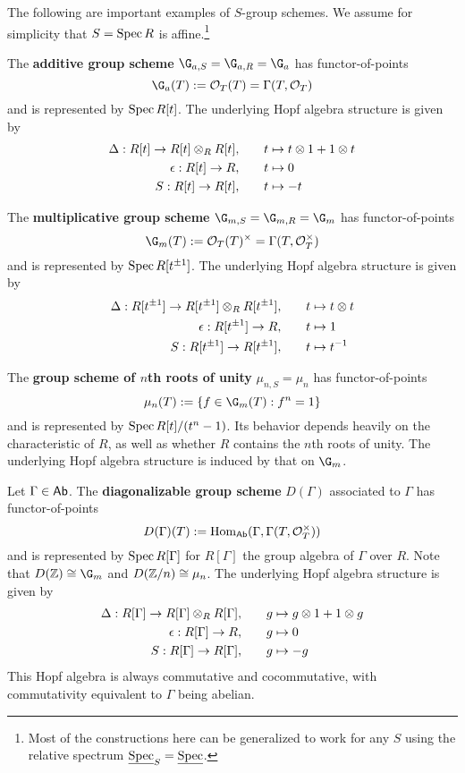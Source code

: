\documentclass[11pt]{article}
\begin{document}
\begin{example}
The following are important examples of $S$-group schemes. We assume for simplicity that $S=\operatorname{Spec} R$ is affine.\footnote{Most of the constructions here can be generalized to work for any $S$ using the relative spectrum $\underline{\operatorname{Spec}}_S=\underline{\operatorname{Spec}}$.}
\begin{enum}{\arabic}
\item The \textbf{additive group scheme} $\G_{a,S}=\G_{a,R}=\G_a$ has functor-of-points 
$$\G_a(T):=\O_T(T)=\Gamma(T,\O_T)$$ 
and is represented by $\operatorname{Spec} R[t]$. The underlying Hopf algebra structure is given by 
\begin{align*}
\Delta: R[t]\to R[t]\otimes_RR[t], \qquad &t\mapsto t\otimes1+1\otimes t \\
\epsilon: R[t]\to R, \qquad &t\mapsto0 \\
S: R[t]\to R[t], \qquad &t\mapsto-t
\end{align*}

\item The \textbf{multiplicative group scheme} $\G_{m,S}=\G_{m,R}=\G_m$ has functor-of-points 
$$\G_m(T):=\O_T(T)^{\times}=\Gamma(T,\O_T^{\times})$$ 
and is represented by $\operatorname{Spec} R[t^{\pm1}]$. The underlying Hopf algebra structure is given by 
\begin{align*}
\Delta: R[t^{\pm1}]\to R[t^{\pm1}]\otimes_RR[t^{\pm1}], \qquad &t\mapsto t\otimes t \\
\epsilon: R[t^{\pm1}]\to R, \qquad &t\mapsto1 \\
S: R[t^{\pm1}]\to R[t^{\pm1}], \qquad &t\mapsto t^{-1}
\end{align*}

\item The \textbf{group scheme of $n$th roots of unity} $\mu_{n,S}=\mu_n$ has functor-of-points 
$$\mu_n(T):=\{f\in\G_m(T) : f^n=1\}$$ 
and is represented by $\operatorname{Spec} R[t]/(t^n-1)$. Its behavior depends heavily on the characteristic of $R$, as well as whether $R$ contains the $n$th roots of unity. The underlying Hopf algebra structure is induced by that on $\G_m$.

\item Let $\Gamma\in\operatorname{\mathsf{Ab}}$. The \textbf{diagonalizable group scheme} $D(\Gamma)$ associated to $\Gamma$ has functor-of-points
$$D(\Gamma)(T):=\operatorname{Hom}_{\operatorname{\mathsf{Ab}}}(\Gamma,\Gamma(T,\mathcal{O}_T^{\times}))$$
and is represented by $\operatorname{Spec} R[\Gamma]$ for $R[\Gamma]$ the group algebra of $\Gamma$ over $R$. Note that $D(\Z)\iso\G_m$ and $D(\mathbb{Z}/n)\cong\mu_n$. The underlying Hopf algebra structure is given by 
\begin{align*}
\Delta: R[\Gamma]\to R[\Gamma]\otimes_RR[\Gamma], \qquad &g\mapsto g\otimes1+1\otimes g \\
\epsilon: R[\Gamma]\to R, \qquad &g\mapsto0 \\
S: R[\Gamma]\to R[\Gamma], \qquad &g\mapsto-g
\end{align*}
This Hopf algebra is always commutative and cocommutative, with commutativity equivalent to $\Gamma$ being abelian.


\end{enum}
\end{example}
\end{document}
